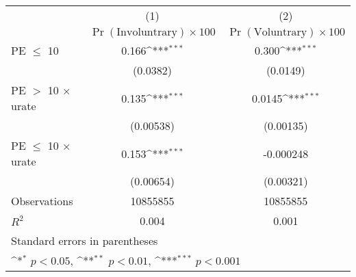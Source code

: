 {
\def\sym#1{\ifmmode^{#1}\else\(^{#1}\)\fi}
\begin{tabular}{l*{2}{c}}
\hline\hline
                                   &\multicolumn{1}{c}{(1)}&\multicolumn{1}{c}{(2)}\\
                                   &\multicolumn{1}{c}{$\Pr(\text{Involuntrary}) \times 100$}&\multicolumn{1}{c}{$\Pr(\text{Voluntrary}) \times 100$}\\
\hline
PE $\leq$ 10                       &       0.166\sym{***}&       0.300\sym{***}\\
                                   &    (0.0382)         &    (0.0149)         \\
[1em]
PE $>$ 10 $\times$ urate           &       0.135\sym{***}&      0.0145\sym{***}\\
                                   &   (0.00538)         &   (0.00135)         \\
[1em]
PE $\leq$ 10 $\times$ urate        &       0.153\sym{***}&   -0.000248         \\
                                   &   (0.00654)         &   (0.00321)         \\
\hline
Observations                       &    10855855         &    10855855         \\
\(R^{2}\)                          &       0.004         &       0.001         \\
\hline\hline
\multicolumn{3}{l}{\footnotesize Standard errors in parentheses}\\
\multicolumn{3}{l}{\footnotesize \sym{*} \(p<0.05\), \sym{**} \(p<0.01\), \sym{***} \(p<0.001\)}\\
\end{tabular}
}
